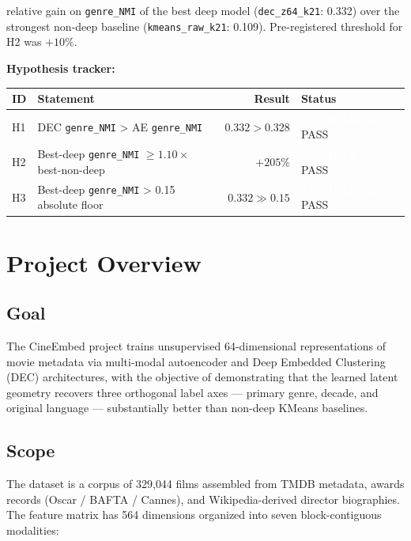\documentclass[11pt,a4paper]{article}
\newcommand{\status}[1]{%
  \ifstrequal{#1}{complete}{\colorbox{brandAccent}{\textcolor{white}{\sffamily\bfseries\small\,COMPLETE\,}}}{%
  \ifstrequal{#1}{inprogress}{\colorbox{brandAmber}{\textcolor{white}{\sffamily\bfseries\small\,IN PROGRESS\,}}}{%
  \ifstrequal{#1}{planned}{\colorbox{brandSecondary}{\textcolor{white}{\sffamily\bfseries\small\,PLANNED\,}}}{%
  \ifstrequal{#1}{deferred}{\colorbox{brandSlate}{\textcolor{white}{\sffamily\bfseries\small\,DEFERRED\,}}}{}}}}%
}
\newcommand{\bignumber}[1]{{\fontsize{36pt}{42pt}\sffamily\bfseries\color{brandPrimary}#1}}
\begin{document}
\vspace{4pt}
\begin{headlinebox}
\noindent\bignumber{$+205\%$} \hfill \begin{minipage}[b]{0.65\linewidth}\raggedleft\small relative gain on \texttt{genre\_NMI} of the best deep model (\texttt{dec\_z64\_k21}: 0.332) over the strongest non-deep baseline (\texttt{kmeans\_raw\_k21}: 0.109). Pre-registered threshold for H2 was $+10\%$.\end{minipage}
\end{headlinebox}

\vspace{4pt}
\noindent\textbf{Hypothesis tracker:}

\begin{center}\small
{}
\begin{tabularx}{\linewidth}{@{}l X r l@{}}
\toprule
\textbf{ID} & \textbf{Statement} & \textbf{Result} & \textbf{Status} \\
\midrule
H1 & DEC \texttt{genre\_NMI} > AE \texttt{genre\_NMI}              & $0.332 > 0.328$ & \status{complete} PASS \\
H2 & Best-deep \texttt{genre\_NMI} $\geq 1.10\times$ best-non-deep  & $+205\%$        & \status{complete} PASS \\
H3 & Best-deep \texttt{genre\_NMI} > 0.15 absolute floor            & $0.332 \gg 0.15$& \status{complete} PASS \\
\bottomrule
\end{tabularx}
\end{center}

\clearpage

\section{Project Overview}
\label{sec:overview}

\subsection{Goal}
The CineEmbed project trains unsupervised 64-dimensional representations of movie metadata via multi-modal autoencoder and Deep Embedded Clustering (DEC) architectures, with the objective of demonstrating that the learned latent geometry recovers three orthogonal label axes --- primary genre, decade, and original language --- substantially better than non-deep KMeans baselines.

\subsection{Scope}
The dataset is a corpus of 329{,}044 films assembled from TMDB metadata, awards records (Oscar / BAFTA / Cannes), and Wikipedia-derived director biographies. The feature matrix has 564 dimensions organized into seven block-contiguous modalities:
\end{document}
